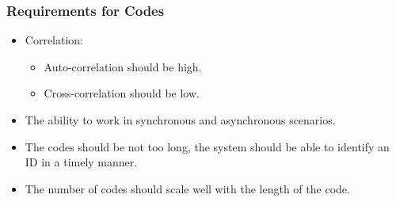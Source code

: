 \documentclass{beamer}
\begin{document}
	\begin{frame}\frametitle{Requirements for Codes}
		
		\begin{itemize}

			\item Correlation:
			\begin{itemize}

				\item Auto-correlation should be high.

				\item Cross-correlation should be low.

			\end{itemize}

			\item The ability to work in synchronous and asynchronous scenarios.

			\item The codes should be not too long, the system should be able to identify an ID in a timely manner.

			\item The number of codes should scale well with the length of the code. 

		\end{itemize}
		
	\end{frame}
\end{document}
